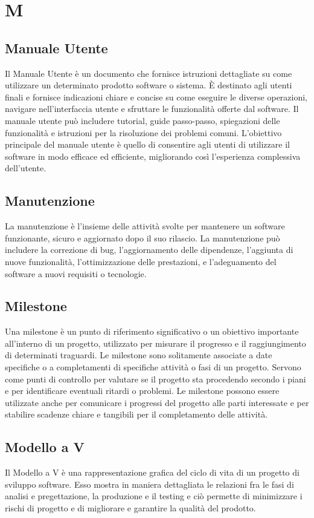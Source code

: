 \section*{M} 
\subsection*{Manuale Utente} 
Il Manuale Utente è un documento che fornisce istruzioni dettagliate su come utilizzare un determinato prodotto software o sistema. È destinato agli utenti finali e fornisce indicazioni chiare e concise su come eseguire le diverse operazioni, navigare nell'interfaccia utente e sfruttare le funzionalità offerte dal software. Il manuale utente può includere tutorial, guide passo-passo, spiegazioni delle funzionalità e istruzioni per la risoluzione dei problemi comuni. L'obiettivo principale del manuale utente è quello di consentire agli utenti di utilizzare il software in modo efficace ed efficiente, migliorando così l'esperienza complessiva dell'utente.
\subsection*{Manutenzione} 
La manutenzione è l'insieme delle attività svolte per mantenere un software funzionante, sicuro e aggiornato dopo il suo rilascio. La manutenzione può includere la correzione di bug, l'aggiornamento delle dipendenze, l'aggiunta di nuove funzionalità, l'ottimizzazione delle prestazioni, e l'adeguamento del software a nuovi requisiti o tecnologie.
\subsection*{Milestone} 
Una milestone è un punto di riferimento significativo o un obiettivo importante all'interno di un progetto, utilizzato per misurare il progresso e il raggiungimento di determinati traguardi. Le milestone sono solitamente associate a date specifiche o a completamenti di specifiche attività o fasi di un progetto. Servono come punti di controllo per valutare se il progetto sta procedendo secondo i piani e per identificare eventuali ritardi o problemi. Le milestone possono essere utilizzate anche per comunicare i progressi del progetto alle parti interessate e per stabilire scadenze chiare e tangibili per il completamento delle attività.
\subsection*{Modello a V} 
Il Modello a V è una rappresentazione grafica del ciclo di vita di un progetto di sviluppo software. Esso mostra in maniera dettagliata le relazioni fra le fasi di analisi e pregettazione, la  produzione e il testing e ciò permette di minimizzare i rischi di progetto e di migliorare e garantire la qualità del prodotto.
